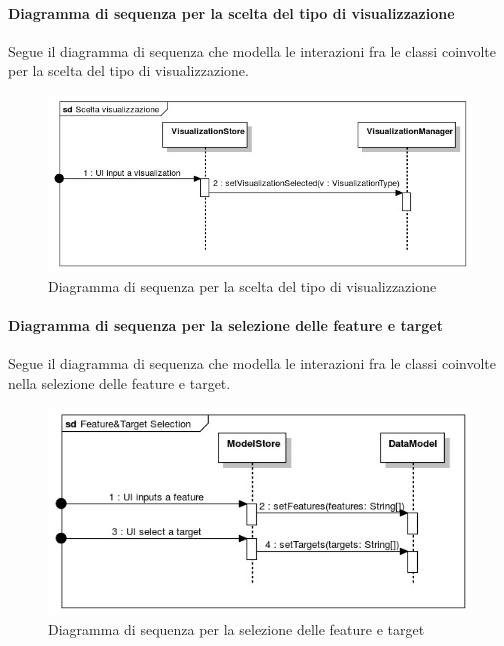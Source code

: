        \paragraph{Diagramma di sequenza per la scelta del tipo di visualizzazione}
        Segue il diagramma di sequenza che modella le interazioni fra le classi coinvolte per la scelta del tipo di visualizzazione.
        \begin{figure}[H]
                \centering\includegraphics[width=1\textwidth]{source/img/sequenza2.jpeg}
                \caption{Diagramma di sequenza per la scelta del tipo di visualizzazione}
            \end{figure}
        \paragraph{Diagramma di sequenza per la selezione delle feature e target}
        Segue il diagramma di sequenza che modella le interazioni fra le classi coinvolte nella selezione delle feature e target.
        \begin{figure}[H]
                \centering\includegraphics[width=1\textwidth]{source/img/sequenza3.jpeg}
                \caption{Diagramma di sequenza per la selezione delle feature e target}
            \end{figure}
        
